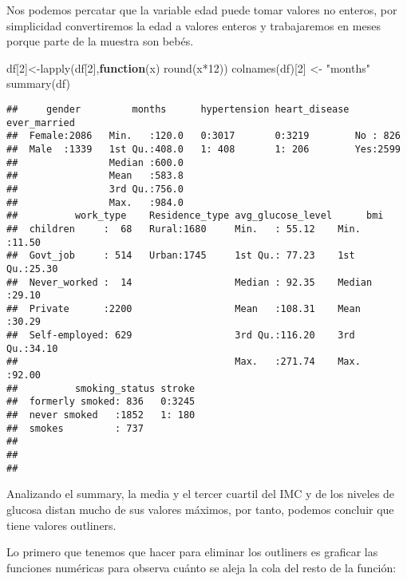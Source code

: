 \documentclass[
]{article}
\newenvironment{Shaded}{\begin{snugshade}}{\end{snugshade}}
\newcommand{\ControlFlowTok}[1]{\textcolor[rgb]{0.13,0.29,0.53}{\textbf{#1}}}
\newcommand{\DecValTok}[1]{\textcolor[rgb]{0.00,0.00,0.81}{#1}}
\newcommand{\FunctionTok}[1]{\textcolor[rgb]{0.00,0.00,0.00}{#1}}
\newcommand{\NormalTok}[1]{#1}
\newcommand{\OtherTok}[1]{\textcolor[rgb]{0.56,0.35,0.01}{#1}}
\newcommand{\SpecialCharTok}[1]{\textcolor[rgb]{0.00,0.00,0.00}{#1}}
\newcommand{\StringTok}[1]{\textcolor[rgb]{0.31,0.60,0.02}{#1}}
\begin{document}
Nos podemos percatar que la variable edad puede tomar valores no
enteros, por simplicidad convertiremos la edad a valores enteros y
trabajaremos en meses porque parte de la muestra son bebés.

\begin{Shaded}
\begin{Highlighting}[]
\NormalTok{df[}\DecValTok{2}\NormalTok{]}\OtherTok{\textless{}{-}}\FunctionTok{lapply}\NormalTok{(df[}\DecValTok{2}\NormalTok{],}\ControlFlowTok{function}\NormalTok{(x) }\FunctionTok{round}\NormalTok{(x}\SpecialCharTok{*}\DecValTok{12}\NormalTok{))}
\FunctionTok{colnames}\NormalTok{(df)[}\DecValTok{2}\NormalTok{]  }\OtherTok{\textless{}{-}} \StringTok{"months"}  
\FunctionTok{summary}\NormalTok{(df)}
\end{Highlighting}
\end{Shaded}

\begin{verbatim}
##     gender         months      hypertension heart_disease ever_married
##  Female:2086   Min.   :120.0   0:3017       0:3219        No : 826    
##  Male  :1339   1st Qu.:408.0   1: 408       1: 206        Yes:2599    
##                Median :600.0                                          
##                Mean   :583.8                                          
##                3rd Qu.:756.0                                          
##                Max.   :984.0                                          
##          work_type    Residence_type avg_glucose_level      bmi       
##  children     :  68   Rural:1680     Min.   : 55.12    Min.   :11.50  
##  Govt_job     : 514   Urban:1745     1st Qu.: 77.23    1st Qu.:25.30  
##  Never_worked :  14                  Median : 92.35    Median :29.10  
##  Private      :2200                  Mean   :108.31    Mean   :30.29  
##  Self-employed: 629                  3rd Qu.:116.20    3rd Qu.:34.10  
##                                      Max.   :271.74    Max.   :92.00  
##          smoking_status stroke  
##  formerly smoked: 836   0:3245  
##  never smoked   :1852   1: 180  
##  smokes         : 737           
##                                 
##                                 
## 
\end{verbatim}

Analizando el summary, la media y el tercer cuartil del IMC y de los
niveles de glucosa distan mucho de sus valores máximos, por tanto,
podemos concluir que tiene valores outliners.

Lo primero que tenemos que hacer para eliminar los outliners es graficar
las funciones numéricas para observa cuánto se aleja la cola del resto
de la función:
\end{document}
